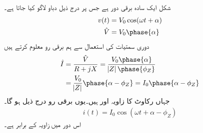 شکل    ایک سادہ   برقی دور ہے جس پر درج ذیل دباو لاگو کیا جاتا ہے۔
\begin{gather}
\begin{aligned}
v(t)&=V_0 \cos (\omega t +\alpha)\\
\hat{V}&=V_0 \phase{\alpha}
\end{aligned}
\end{gather}
دوری سمتیات کی استعمال سے ہم  برقی رو  معلوم کرتے ہیں
\begin{gather}
\begin{aligned}
\hat{I}&=\frac{\hat{V}}{R+j X}=\frac{V_0 \phase{\alpha}}{\abs{Z} \phase {\phi_Z}}\\
&=\frac{V_0}{\abs{Z}} \phase{\alpha-\phi_Z}=I_0 \phase{\alpha-\phi_Z}
\end{aligned}
\end{gather}
جہاں  رکاوٹ کا زاویہ اور    ہیں۔یوں  برقی رو درج ذیل ہو گا۔
\begin{align}\label{مساوات_بنیادی_حقائق_دوری_سمتیہ_سے_مزاحمت_امالہ_دور_حل}
i(t)=I_0 \cos (\omega t +\alpha-\phi_Z)
\end{align}
اس دور میں   زاویہ  کے برابر ہے۔
